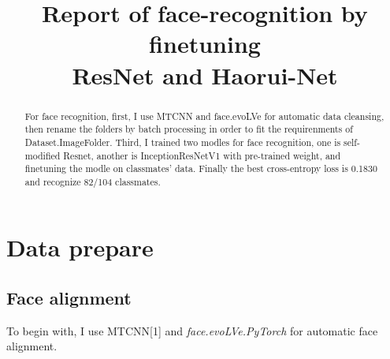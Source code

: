 \documentclass{article}
\title{Report of face-recognition by finetuning \\ ResNet and Haorui-Net}
\author{
   Haorui Li\thanks \\
  Chien-Shiung Wu College\\
  Southeast University\\
}
\begin{document}
\maketitle

\begin{abstract}
For face recognition, first, I use MTCNN and face.evoLVe for automatic data cleansing, then rename the folders by batch processing in order to fit the requirenments of Dataset.ImageFolder. Third, I trained two modles for face recognition, one is self-modified Resnet, another is InceptionResNetV1 with pre-trained weight, and finetuning the modle on classmates' data. Finally the best cross-entropy loss is 0.1830 and recognize 82/104 classmates.  
\end{abstract}

\section{Data prepare}
\subsection{Face alignment}
To begin with, I use MTCNN[1] and \textit{face.evoLVe.PyTorch} for automatic face alignment.
\end{document}
